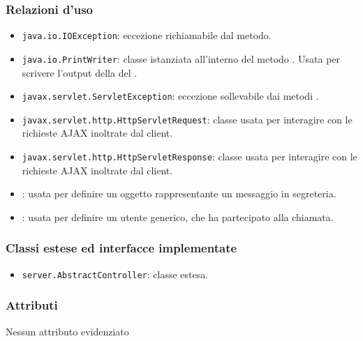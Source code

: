 \subsubsection*{Relazioni d'uso}
\begin{itemize}
	\item \texttt{java.io.IOException}: eccezione richiamabile dal metodo.
	\item \texttt{java.io.PrintWriter}: classe istanziata all'interno del metodo . Usata per scrivere l'output della del .
	\item \texttt{javax.servlet.ServletException}: eccezione sollevabile dai metodi .
	\item \texttt{javax.servlet.http.HttpServletRequest}: classe usata per interagire con le richieste AJAX inoltrate dal client.
	\item \texttt{javax.servlet.http.HttpServletResponse}: classe usata per interagire con le richieste AJAX inoltrate dal client.
	\item {}: usata per definire un oggetto rappresentante un messaggio in segreteria.
	\item {}: usata per definire un utente generico, che ha partecipato alla chiamata.
\end{itemize}

\subsubsection*{Classi estese ed interfacce implementate}
\begin{itemize}
	\item \texttt{server.AbstractController}: classe estesa.
\end{itemize}

\subsubsection*{Attributi}

Nessun attributo evidenziato

